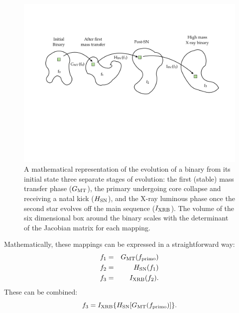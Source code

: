 \documentclass[12pt, preprint]{aastex}
\begin{document}
\begin{figure}[h!]
\begin{center}
\includegraphics[width=0.95\columnwidth]{Mapping.pdf}
\caption{A mathematical representation of the evolution of a binary from its initial state three separate stages of evolution: the first (stable) mass transfer phase ($G_{\rm MT}$), the primary undergoing core collapse and receiving a natal kick ($H_{\rm SN}$), and the X-ray luminous phase once the second star evolves off the main sequence ($I_{\rm XRB}$). The volume of the six dimensional box around the binary scales with the determinant of the Jacobian matrix for each mapping.}
\label{fig:Mapping}
\end{center}
\end{figure}

Mathematically, these mappings can be expressed in a straightforward way:
\begin{eqnarray}
f_1 &=& G_{\rm MT} (f_{\rm primo}) \\
f_2 &=& H_{\rm SN} (f_1) \\
f_3 &=& I_{\rm XRB} (f_2). \\
\end{eqnarray}
These can be combined:
\begin{equation}
f_3 = I_{\rm XRB}\{ H_{\rm SN}[ G_{\rm MT} ( f_{\rm primo}) ] \}.
\end{equation}
\end{document}
